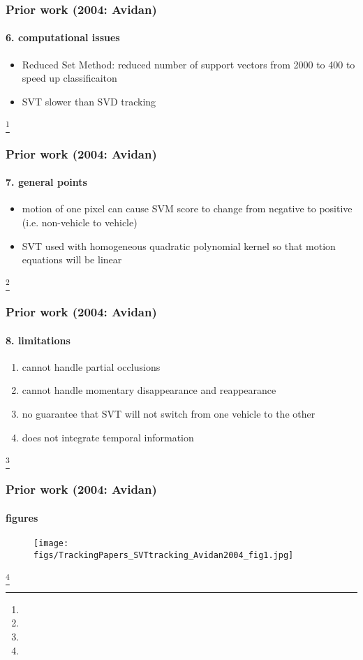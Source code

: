 \begin{frame}
\frametitle{Prior work (2004: Avidan)}
\framesubtitle{6. computational issues}
\logoCSIPCPL\mypagenum
	\begin{itemize}
		\item Reduced Set Method: reduced number of support vectors from 2000 to 400 to speed up classificaiton
		\item SVT slower than SVD tracking
	\end{itemize}
\footnote{\tiny {}}
\end{frame}



\begin{frame}
\frametitle{Prior work (2004: Avidan)}
\framesubtitle{7. general points}
\logoCSIPCPL\mypagenum
	\begin{itemize}
		\item motion of one pixel can cause SVM score to change from negative to positive (i.e. non-vehicle to vehicle)
		\item SVT used with homogeneous quadratic polynomial kernel so that motion equations will be linear
	\end{itemize}
\footnote{\tiny {}}
\end{frame}


\begin{frame}
\frametitle{Prior work (2004: Avidan)}
\framesubtitle{8. limitations}
\logoCSIPCPL\mypagenum
	\begin{enumerate}
		\item cannot handle partial occlusions
		\item cannot handle momentary disappearance and reappearance
		\item no guarantee that SVT will not switch from one vehicle to the other
		\item does not integrate temporal information
	\end{enumerate}
\footnote{\tiny {}}
\end{frame}




\begin{frame}
\frametitle{Prior work (2004: Avidan)}
\framesubtitle{figures}
\logoCSIPCPL\mypagenum
	\begin{figure}
		\texttt{[image: figs/TrackingPapers\_SVTtracking\_Avidan2004\_fig1.jpg]}
	\end{figure}
\footnote{\tiny {}}
\end{frame}



